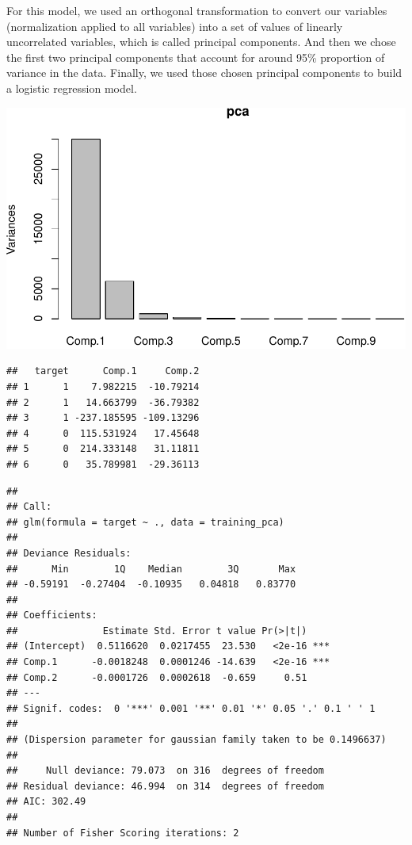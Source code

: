 \documentclass[]{article}
\begin{document}
For this model, we used an orthogonal transformation to convert our
variables (normalization applied to all variables) into a set of values
of linearly uncorrelated variables, which is called principal
components. And then we chose the first two principal components that
account for around 95\% proportion of variance in the data. Finally, we
used those chosen principal components to build a logistic regression
model.

\includegraphics{HW3_Final_files/figure-latex/unnamed-chunk-13-1.pdf}

\begin{verbatim}
##   target      Comp.1     Comp.2
## 1      1    7.982215  -10.79214
## 2      1   14.663799  -36.79382
## 3      1 -237.185595 -109.13296
## 4      0  115.531924   17.45648
## 5      0  214.333148   31.11811
## 6      0   35.789981  -29.36113
\end{verbatim}

\begin{verbatim}
## 
## Call:
## glm(formula = target ~ ., data = training_pca)
## 
## Deviance Residuals: 
##      Min        1Q    Median        3Q       Max  
## -0.59191  -0.27404  -0.10935   0.04818   0.83770  
## 
## Coefficients:
##               Estimate Std. Error t value Pr(>|t|)    
## (Intercept)  0.5116620  0.0217455  23.530   <2e-16 ***
## Comp.1      -0.0018248  0.0001246 -14.639   <2e-16 ***
## Comp.2      -0.0001726  0.0002618  -0.659     0.51    
## ---
## Signif. codes:  0 '***' 0.001 '**' 0.01 '*' 0.05 '.' 0.1 ' ' 1
## 
## (Dispersion parameter for gaussian family taken to be 0.1496637)
## 
##     Null deviance: 79.073  on 316  degrees of freedom
## Residual deviance: 46.994  on 314  degrees of freedom
## AIC: 302.49
## 
## Number of Fisher Scoring iterations: 2
\end{verbatim}
\end{document}
